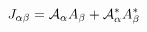 \begin{equation}
J_{\alpha\beta}={\cal{A}}_\alpha A_\beta + {\cal{A}}_\alpha^* A_\beta^*
\end{equation}

